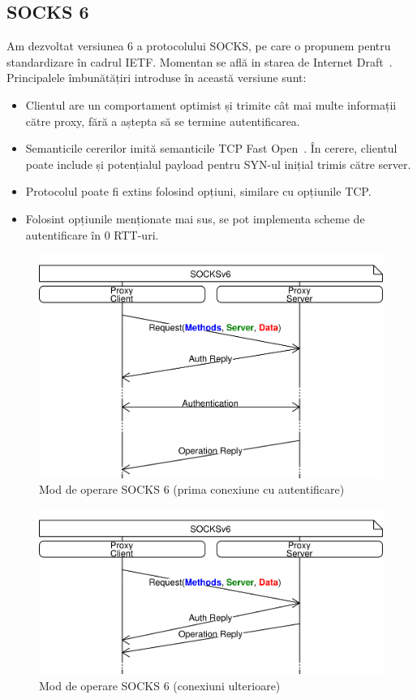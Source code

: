 \subsection{SOCKS 6}

Am dezvoltat versiunea 6 a protocolului SOCKS, pe care o propunem pentru standardizare în cadrul IETF. Momentan se află in starea de Internet Draft~\cite{socks6}.
Principalele îmbunătățiri introduse în această versiune sunt:
\begin{itemize}
	\item Clientul are un comportament optimist și trimite cât mai multe informații către proxy, fără a aștepta să se termine autentificarea.
	\item Semanticile cererilor imită semanticile TCP Fast Open~\cite{rfc7413}. În cerere, clientul poate include și potențialul payload pentru SYN-ul inițial trimis către server.
	\item Protocolul poate fi extins folosind opțiuni, similare cu opțiunile TCP.
	\item Folosint opțiunile menționate mai sus, se pot implementa scheme de autentificare în 0 RTT-uri.
\end{itemize}


\begin{figure}[h]
	\centering
	\includegraphics[scale=0.7]{figures/socks/socks6op1st.png}
	\caption{Mod de operare SOCKS 6 (prima conexiune cu autentificare)}
    	\label{fig:socks6op1st}
\end{figure}

\begin{figure}[h]
	\centering
	\includegraphics[scale=0.7]{figures/socks/socks6op2nd.png}
	\caption{Mod de operare SOCKS 6 (conexiuni ulterioare)}
    	\label{fig:socks6op2nd}
\end{figure}

